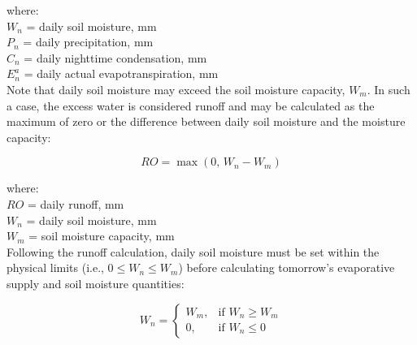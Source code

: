 \noindent where: \\
\indent $W_n$ = daily soil moisture, mm\\
\indent $P_n$ = daily precipitation, mm\\
\indent $C_n$ = daily nighttime condensation, mm\\
\indent $E^a_n$ = daily actual evapotranspiration, mm\\

\noindent Note that daily soil moisture may exceed the soil moisture capacity, $W_m$. 
In such a case, the excess water is considered runoff and may be calculated as the maximum of zero or the difference between daily soil moisture and the moisture capacity:

\begin{equation}
\label{eq:ro}
	RO = \max\left(0\text{, }W_n - W_m\right)
\end{equation}

\noindent where: \\
\indent $RO$ = daily runoff, mm\\
\indent $W_n$ = daily soil moisture, mm\\
\indent $W_m$ = soil moisture capacity, mm\\

\noindent Following the runoff calculation, daily soil moisture must be set within the physical limits (i.e., $0\leq W_n\leq W_m$) before calculating tomorrow's evaporative supply and soil moisture quantities:

\begin{equation}
\label{eq:wn}
	W_n = 
	\begin{cases}
		W_m, & \text{if } W_n \geq W_m\\
		0, & \text{if } W_n \leq 0
	\end{cases}
\end{equation}

